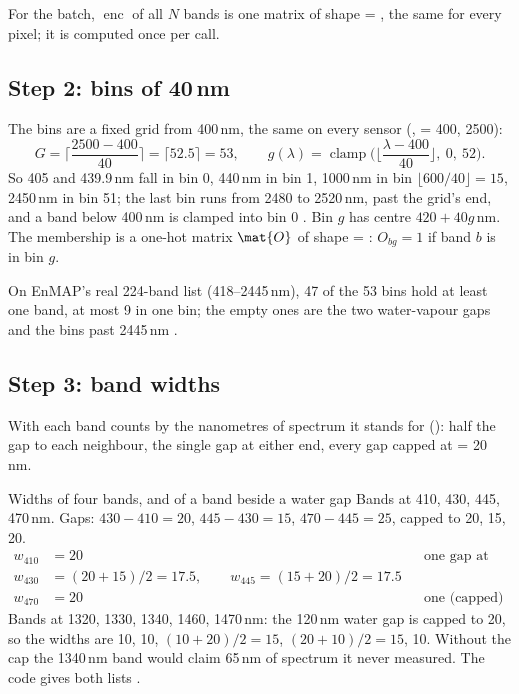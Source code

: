 For the batch, $\operatorname{enc}$ of all $N$ bands is one matrix of shape  = , the
same for every pixel; it is computed once per call.

\subsection{Step 2: bins of 40\,nm}

The bins are a fixed grid from 400\,nm, the same on every sensor (,  = 400, 2500):
\begin{equation}
G=\Big\lceil\frac{2500-400}{40}\Big\rceil=\lceil52.5\rceil=53,\qquad
g(\lambda)=\operatorname{clamp}\Big(\Big\lfloor\frac{\lambda-400}{40}\Big\rfloor,\ 0,\ 52\Big).
\end{equation}
So 405 and 439.9\,nm fall in bin 0, 440\,nm in bin 1, 1000\,nm in bin $\lfloor600/40\rfloor=15$, 2450\,nm in bin 51; the
last bin runs from 2480 to 2520\,nm, past the grid's end, and a band below 400\,nm is clamped into bin 0 \tagC. Bin $g$
has centre $420+40g$\,nm. The membership is a one-hot matrix $\mat{O}$ of shape  = :
$O_{bg}=1$ if band $b$ is in bin $g$.

On EnMAP's real 224-band list (418--2445\,nm), 47 of the 53 bins hold at least one band, at most 9 in one bin; the
empty ones are the two water-vapour gaps and the bins past 2445\,nm \tagC.

\subsection{Step 3: band widths}

With  each band counts by the nanometres of spectrum it stands for ():
half the gap to each neighbour, the single gap at either end, every gap capped at  = 20\,nm.

\begin{worked}[label={we:namer:widths}]{Widths of four bands, and of a band beside a water gap}
Bands at 410, 430, 445, 470\,nm. Gaps: $430-410=20$, $445-430=15$, $470-445=25$, capped to 20, 15, 20.
\begin{align*}
w_{410} &= 20 &&\text{one gap at the end}\\
w_{430} &= (20+15)/2 = 17.5,\qquad w_{445} = (15+20)/2 = 17.5\\
w_{470} &= 20 &&\text{one (capped) gap at the end}
\end{align*}
Bands at 1320, 1330, 1340, 1460, 1470\,nm: the 120\,nm water gap is capped to 20, so the widths are 10, 10,
$(10+20)/2=15$, $(20+10)/2=15$, 10. Without the cap the 1340\,nm band would claim 65\,nm of spectrum it never measured.
The code gives both lists \tagC.
\end{worked}

